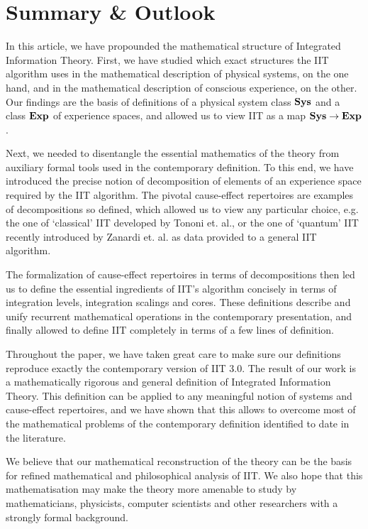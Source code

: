 \section{Summary \& Outlook} \label{sec:discussion}

In this article, we have propounded the mathematical structure of Integrated Information Theory.
First, we have studied which exact structures the IIT algorithm uses in the mathematical description of physical systems, on the one hand, and in the mathematical description of conscious experience, on the other. Our findings are the basis of definitions of a physical system class $\mathbf{Sys}$ and a class $\mathbf{Exp}$ of experience spaces, and allowed us to view IIT as a map $\mathbf{Sys} \rightarrow \mathbf{Exp}$.

Next, we needed to disentangle the essential mathematics of the theory from auxiliary formal tools used in the contemporary definition. To this end, we have introduced the precise notion of decomposition of elements of an experience space required by the IIT algorithm. The pivotal cause-effect repertoires are examples of decompositions so defined, which allowed us to view any particular choice, e.g. the one of `classical' IIT developed by Tononi et. al., or the one of `quantum' IIT recently introduced by Zanardi et. al. as data provided to a general IIT algorithm.

The formalization of cause-effect repertoires in terms of decompositions then led us to define the essential ingredients of IIT's algorithm concisely in terms of integration levels, integration scalings and cores. These definitions describe and unify recurrent mathematical operations in the contemporary presentation, and finally allowed to define IIT completely in terms of a few lines of definition.

Throughout the paper, we have taken great care to make sure our definitions reproduce exactly the contemporary version of IIT 3.0. The result of our work is a mathematically rigorous and general definition of Integrated Information Theory. This definition can be applied to any meaningful notion of systems and cause-effect repertoires, and we have shown that this allows to overcome most of the mathematical problems of the contemporary definition identified to date in the literature.

We believe that our mathematical reconstruction of the theory can be the basis for refined mathematical and philosophical analysis of IIT. We also hope that this mathematisation may make the theory more amenable to study by mathematicians, physicists, computer scientists and other researchers with a strongly formal background.


